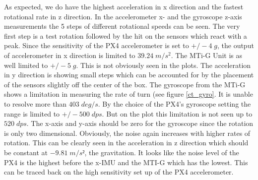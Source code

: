As expected, we do have the highest acceleration in x direction and the fastest rotational rate in z direction. In the accelerometer x-  and the gyroscope z-axis measurements the 5 steps of different rotational speeds can be seen. The very first step is a test rotation followed by the hit on the sensors which react with a peak. Since the sensitivity of the PX4 accelerometer is set to $+/- 4 \;g$, the output of accelerometer in x direction is limited to $39.24 \;m/s^2$. The MTi-G Unit is as well limited to $+/- 5\;g$. This is not obviously seen in the plots. The acceleration in y direction is showing small steps which can be accounted for by the placement of the sensors slightly off the center of the box. The gyroscope from the MTi-G shows a limitation in measuring the rate of turn (see figure \ref{ct_gyro}. It is unable to resolve more than $ 403 \;deg/s$. By the choice of the PX4's gyroscope setting the range is limited to $+/- 500\;dps$. But on the plot this limitation is not seen up to $520\;dps$. The x-axis and y-axis should be zero for the gyroscope since the rotation is only two dimensional. Obviously, the noise again increases with higher rates of rotation. This can be clearly seen in the acceleration in z direction which should be constant at $-9.81 \;m/s²$, the gravitation. It looks like the noise level of the PX4 is the highest before the x-IMU and the MTI-G which has the lowest. This can be traced back on the high sensitivity set up of the PX4 accelerometer.


